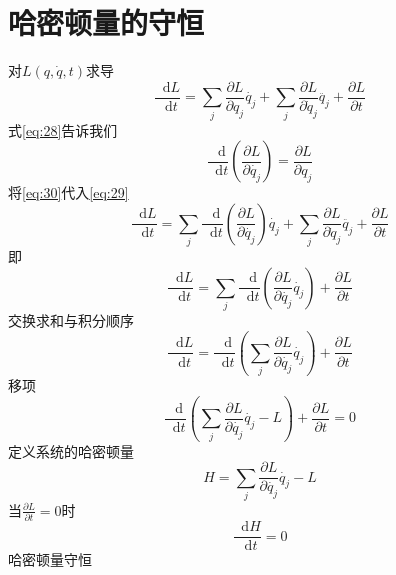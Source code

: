 \documentclass{article}
\newcommand*{\dif}{\mathop{}\!\mathrm{d}}
\begin{document}
\section{哈密顿量的守恒}

对$L \left( q, \dot{q} ,t \right)$求导
\begin{equation}
  \label{eq:29}
  \frac{\dif L}{\dif t} = \sum\limits_{j} \frac{\partial L}{\partial q_{j}} \dot{q_{j}} + \sum\limits_{j} \frac{\partial L}{\partial \dot{q}_{j}} \ddot{q_{j}} + \frac{\partial L}{\partial t}
\end{equation}
式\ref{eq:28}告诉我们
\begin{equation}
  \label{eq:30}
  \frac{\dif}{\dif t} \left( \frac{\partial L}{\partial \dot{q_{j}}} \right) = \frac{\partial L}{\partial q_{j}}
\end{equation}
将\ref{eq:30}代入\ref{eq:29}
\begin{equation}
  \label{eq:31}
  \frac{\dif L}{\dif t} = \sum\limits_{j}\frac{\dif}{\dif t} \left( \frac{\partial L}{\partial \dot{q_{j}}} \right)  \dot{q_{j}} + \sum\limits_{j} \frac{\partial L}{\partial \dot{q}_{j}} \ddot{q_{j}} + \frac{\partial L}{\partial t}
\end{equation}
即
\begin{equation}
  \label{eq:32}
  \frac{\dif L}{\dif t} = \sum\limits_{j}\frac{\dif}{\dif t} \left( \frac{\partial L}{\partial \dot{q_{j}}} \dot{q_{j}} \right) + \frac{\partial L}{\partial t}
\end{equation}
交换求和与积分顺序
\begin{equation}
  \label{eq:33}
  \frac{\dif L}{\dif t} = \frac{\dif}{\dif t} \left( \sum\limits_{j}  \frac{\partial L}{\partial \dot{q_{j}}} \dot{q_{j}} \right) + \frac{\partial L}{\partial t}
\end{equation}
移项
\begin{equation}
  \label{eq:34}
  \frac{\dif}{\dif t} \left( \sum\limits_{j} \frac{\partial L}{\partial \dot{q_{j}}} \dot{q_{j}} -L \right) + \frac{\partial L}{\partial t} = 0
\end{equation}
定义系统的哈密顿量
\begin{equation}
  \label{eq:35}
  H = \sum\limits_{j} \frac{\partial L}{\partial \dot{q_{j}}} \dot{q_{j}} -L 
\end{equation}
当$\frac{\partial L}{\partial t}=0$时
\begin{equation}
  \label{eq:36}
  \frac{\dif H}{\dif t} = 0
\end{equation}
哈密顿量守恒
\end{document}
